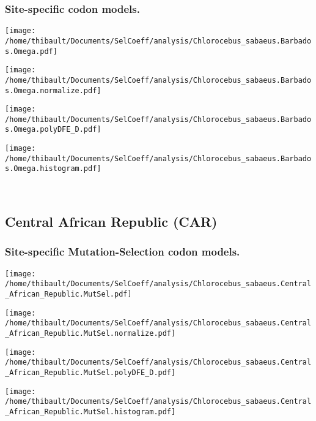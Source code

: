 \subsubsection*{Site-specific codon models.} 
\begin{minipage}{0.49\linewidth} 
\texttt{[image: /home/thibault/Documents/SelCoeff/analysis/Chlorocebus\_sabaeus.Barbados.Omega.pdf]} 
\end{minipage}
\begin{minipage}{0.49\linewidth} 
\texttt{[image: /home/thibault/Documents/SelCoeff/analysis/Chlorocebus\_sabaeus.Barbados.Omega.normalize.pdf]} 
\end{minipage}
\begin{minipage}{0.49\linewidth} 
\texttt{[image: /home/thibault/Documents/SelCoeff/analysis/Chlorocebus\_sabaeus.Barbados.Omega.polyDFE\_D.pdf]} 
\end{minipage}
\begin{minipage}{0.49\linewidth} 
\texttt{[image: /home/thibault/Documents/SelCoeff/analysis/Chlorocebus\_sabaeus.Barbados.Omega.histogram.pdf]} 
\end{minipage}
\\ 
\subsection{Central African Republic (CAR)} 
 
\subsubsection*{Site-specific Mutation-Selection codon models.} 
\begin{minipage}{0.49\linewidth} 
\texttt{[image: /home/thibault/Documents/SelCoeff/analysis/Chlorocebus\_sabaeus.Central\_African\_Republic.MutSel.pdf]} 
\end{minipage}
\begin{minipage}{0.49\linewidth} 
\texttt{[image: /home/thibault/Documents/SelCoeff/analysis/Chlorocebus\_sabaeus.Central\_African\_Republic.MutSel.normalize.pdf]} 
\end{minipage}
\begin{minipage}{0.49\linewidth} 
\texttt{[image: /home/thibault/Documents/SelCoeff/analysis/Chlorocebus\_sabaeus.Central\_African\_Republic.MutSel.polyDFE\_D.pdf]} 
\end{minipage}
\begin{minipage}{0.49\linewidth} 
\texttt{[image: /home/thibault/Documents/SelCoeff/analysis/Chlorocebus\_sabaeus.Central\_African\_Republic.MutSel.histogram.pdf]} 
\end{minipage}
\\ 

